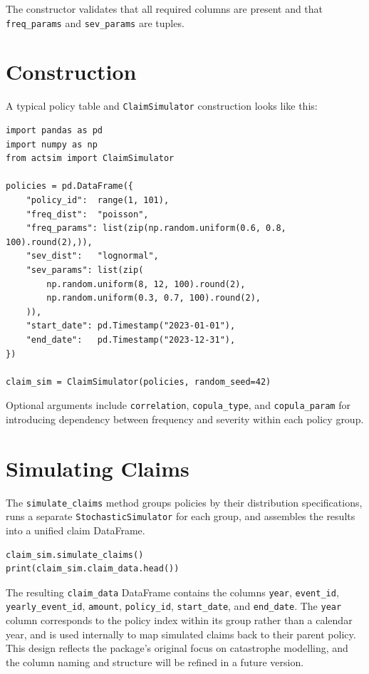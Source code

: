 The constructor validates that all required columns are present and
that \texttt{freq\_params} and \texttt{sev\_params} are tuples.

\section{Construction}

A typical policy table and \texttt{ClaimSimulator} construction looks
like this:

\begin{lstlisting}[style=pythonstyle]
import pandas as pd
import numpy as np
from actsim import ClaimSimulator

policies = pd.DataFrame({
    "policy_id":  range(1, 101),
    "freq_dist":  "poisson",
    "freq_params": list(zip(np.random.uniform(0.6, 0.8, 100).round(2),)),
    "sev_dist":   "lognormal",
    "sev_params": list(zip(
        np.random.uniform(8, 12, 100).round(2),
        np.random.uniform(0.3, 0.7, 100).round(2),
    )),
    "start_date": pd.Timestamp("2023-01-01"),
    "end_date":   pd.Timestamp("2023-12-31"),
})

claim_sim = ClaimSimulator(policies, random_seed=42)
\end{lstlisting}

Optional arguments include \texttt{correlation}, \texttt{copula\_type},
and \texttt{copula\_param} for introducing dependency between frequency
and severity within each policy group.

\section{Simulating Claims}

The \texttt{simulate\_claims} method groups policies by their distribution
specifications, runs a separate \texttt{StochasticSimulator} for each
group, and assembles the results into a unified claim DataFrame.

\begin{lstlisting}[style=pythonstyle]
claim_sim.simulate_claims()
print(claim_sim.claim_data.head())
\end{lstlisting}

The resulting \texttt{claim\_data} DataFrame contains the columns
\texttt{year}, \texttt{event\_id}, \texttt{yearly\_event\_id},
\texttt{amount}, \texttt{policy\_id}, \texttt{start\_date}, and
\texttt{end\_date}. The \texttt{year} column corresponds to the policy
index within its group rather than a calendar year, and is used
internally to map simulated claims back to their parent policy. This 
design reflects the package's original focus on catastrophe modelling, 
and the column naming and structure will be refined in a future version.

